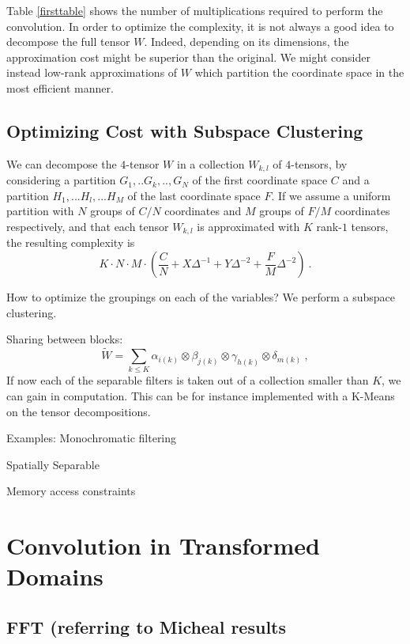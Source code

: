 \documentclass{article}
\begin{document}
Table \ref{firsttable} shows the number of multiplications required to perform the 
convolution. In order to optimize the complexity, it is not always a good idea 
to decompose the full tensor $W$. Indeed, depending on its dimensions, 
the approximation cost might be superior than the original.
We might consider instead low-rank approximations of $W$ 
which partition the coordinate space in the most efficient manner.

\subsection{Optimizing Cost with Subspace Clustering}

We can decompose the $4$-tensor $W$ in a collection $W_{k,l}$ of $4$-tensors, 
by considering a partition $G_1,..G_k,..,G_N$ of the first coordinate space $C$ and
a partition $H_1,...H_l,...H_M$ of the last coordinate space $F$. 
 If we assume a uniform partition with $N$ groups of $C/N$ coordinates and 
 $M$ groups of $F/M$ coordinates respectively, and that each tensor $W_{k,l}$ 
 is approximated with $K$ rank-$1$ tensors, the resulting complexity is 
 $$K \cdot N \cdot M \cdot \left( \frac{C}{N} + X \Delta^{-1} + Y \Delta^{-2} + \frac{F}{M} \Delta^{-2}\right)~.$$
 
 How to optimize the groupings on each of the variables? We perform a subspace clustering. 
 
 
 Sharing between blocks: 
\begin{equation}
\label{rankoptim}
 \widetilde{W} = \sum_{k\leq K} \alpha_{i(k)} \otimes \beta_{j(k)} \otimes \gamma_{h(k)} \otimes \delta_{m(k)}~,
\end{equation}
If now each of the separable filters is taken out of a collection smaller than $K$, we can gain 
in computation. This can be for instance implemented with a K-Means on the tensor decompositions.


Examples:
Monochromatic filtering

Spatially Separable

Memory access constraints

\section{Convolution in Transformed Domains}

\subsection{FFT (referring to Micheal results}
\end{document}
